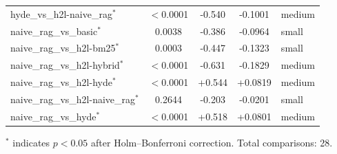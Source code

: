\begin{table}[t]
\begin{tabular}{lcccl}
hyde\_vs\_h2l-naive\_rag$^*$ & $<$0.0001 & -0.540 & -0.1001 & medium \\
naive\_rag\_vs\_basic$^*$ & 0.0038 & -0.386 & -0.0964 & small \\
naive\_rag\_vs\_h2l-bm25$^*$ & 0.0003 & -0.447 & -0.1323 & small \\
naive\_rag\_vs\_h2l-hybrid$^*$ & $<$0.0001 & -0.631 & -0.1829 & medium \\
naive\_rag\_vs\_h2l-hyde$^*$ & $<$0.0001 & +0.544 & +0.0819 & medium \\
naive\_rag\_vs\_h2l-naive\_rag$^*$ & 0.2644 & -0.203 & -0.0201 & small \\
naive\_rag\_vs\_hyde$^*$ & $<$0.0001 & +0.518 & +0.0801 & medium \\
\bottomrule
\end{tabular}
\vspace{2mm}
\footnotesize{$^*$ indicates $p < 0.05$ after Holm–Bonferroni correction. Total comparisons: 28.}
\end{table}
